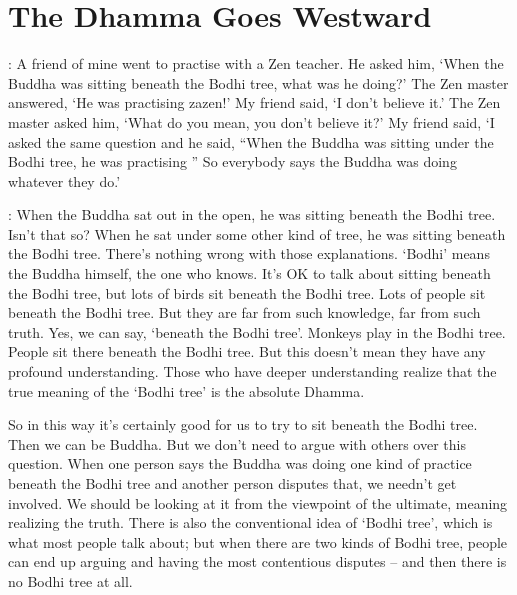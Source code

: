 
\chapter{The Dhamma Goes Westward}

\noindent{}: A friend of mine went to practise with a Zen teacher. He asked him, `When the Buddha was sitting beneath the Bodhi tree, what was he doing?' The Zen master answered, `He was practising zazen!' My friend said, `I don't believe it.' The Zen master asked him, `What do you mean, you don't believe it?' My friend said, `I asked  the same question and he said, ``When the Buddha was sitting under the Bodhi tree, he was practising '' So everybody says the Buddha was doing whatever they do.'

\noindent{}: When the Buddha sat out in the open, he was sitting beneath the Bodhi tree. Isn't that so? When he sat under some other kind of tree, he was sitting beneath the Bodhi tree. There's nothing wrong with those explanations. `Bodhi' means the Buddha himself, the one who knows. It's OK to talk about sitting beneath the Bodhi tree, but lots of birds sit beneath the Bodhi tree. Lots of people sit beneath the Bodhi tree. But they are far from such knowledge, far from such truth. Yes, we can say, `beneath the Bodhi tree'. Monkeys play in the Bodhi tree. People sit there beneath the Bodhi tree. But this doesn't mean they have any profound understanding. Those who have deeper understanding realize that the true meaning of the `Bodhi tree' is the absolute Dhamma.

So in this way it's certainly good for us to try to sit beneath the Bodhi tree. Then we can be Buddha. But we don't need to argue with others over this question. When one person says the Buddha was doing one kind of practice beneath the Bodhi tree and another person disputes that, we needn't get involved. We should be looking at it from the viewpoint of the ultimate, meaning realizing the truth. There is also the conventional idea of `Bodhi tree', which is what most people talk about; but when there are two kinds of Bodhi tree, people can end up arguing and having the most contentious disputes -- and then there is no Bodhi tree at all.

